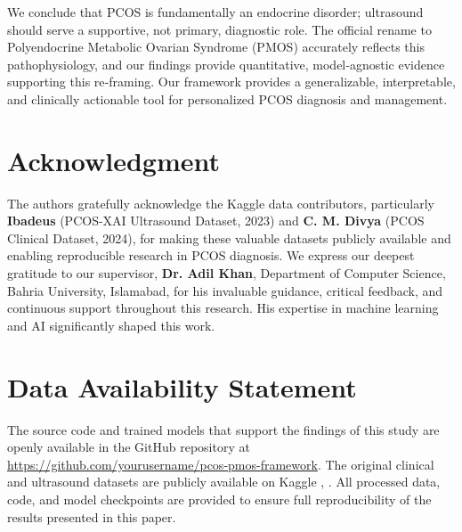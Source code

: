 \documentclass[conference]{IEEEtran}
\begin{document}
We conclude that PCOS is fundamentally an endocrine disorder; ultrasound should serve a supportive, not primary, diagnostic role. The official rename to Polyendocrine Metabolic Ovarian Syndrome (PMOS) \cite{TeedeLancet2026} accurately reflects this pathophysiology, and our findings provide quantitative, model‑agnostic evidence supporting this re‑framing. Our framework provides a generalizable, interpretable, and clinically actionable tool for personalized PCOS diagnosis and management.

\section*{Acknowledgment}

The authors gratefully acknowledge the Kaggle data contributors, particularly \textbf{Ibadeus} (PCOS-XAI Ultrasound Dataset, 2023) and \textbf{C. M. Divya} (PCOS Clinical Dataset, 2024), for making these valuable datasets publicly available and enabling reproducible research in PCOS diagnosis. We express our deepest gratitude to our supervisor, \textbf{Dr. Adil Khan}, Department of Computer Science, Bahria University, Islamabad, for his invaluable guidance, critical feedback, and continuous support throughout this research. His expertise in machine learning and AI significantly shaped this work. 

\section*{Data Availability Statement}

The source code and trained models that support the findings of this study are openly available in the GitHub repository at \url{https://github.com/yourusername/pcos-pmos-framework}. The original clinical and ultrasound datasets are publicly available on Kaggle \cite{PCOSclinicalKaggle}, \cite{PCOSultrasoundKaggle}. All processed data, code, and model checkpoints are provided to ensure full reproducibility of the results presented in this paper.
\end{document}
